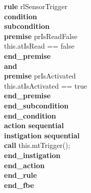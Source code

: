 \begin{algorithm}
\begin{algorithmic}[1]
\STATE \hspace{0.1cm} \textbf{rule} rlSensorTrigger \\
\STATE \hspace{0.2cm} \textbf{condition} \\
\STATE \hspace{0.3cm} \textbf{subcondition} \\
\STATE \hspace{0.4cm} \textbf{premise} prIsReadFalse \\
\STATE \hspace{0.5cm} this.atIsRead == false \\
\STATE \hspace{0.4cm} \textbf{end\_premise} \\
\STATE \hspace{0.4cm} \textbf{and} \\
\STATE \hspace{0.4cm} \textbf{premise} prIsActivated \\
\STATE \hspace{0.5cm} this.atIsActivated == true \\
\STATE \hspace{0.4cm} \textbf{end\_premise} \\
\STATE \hspace{0.3cm} \textbf{end\_subcondition} \\
\STATE \hspace{0.2cm} \textbf{end\_condition} \\

\STATE \hspace{0.2cm} \textbf{action sequential} \\
\STATE \hspace{0.3cm} \textbf{instigation sequential} \\
\STATE \hspace{0.4cm} \textbf{call} this.mtTrigger(); \\
\STATE \hspace{0.3cm} \textbf{end\_instigation} \\
\STATE \hspace{0.1cm} \textbf{end\_action} \\
\STATE \hspace{0.cm} \textbf{end\_rule} \\
\STATE\textbf{end\_fbe}

\end{algorithmic}
\end{algorithm}



